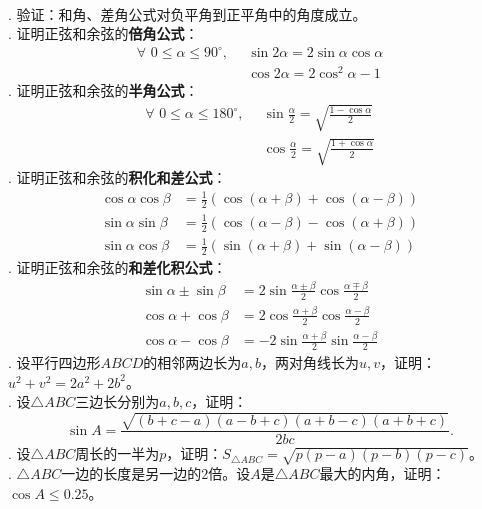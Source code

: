 \documentclass[12pt,UTF8,fontset=none]{ctexbook}
\begin{document}
\begin{xt}\label{xt:2-4-10}
    \mbox{} \\
    . 验证：和角、差角公式对负平角到正平角中的角度成立。 \\
    . 证明正弦和余弦的\textbf{倍角公式}：
    \begin{align*}
        \forall \,\, 0 \leqslant \alpha \leqslant 90^\circ , \,\,\, & \sin 2\alpha = 2\sin \alpha \cos \alpha  \\
        & \cos 2\alpha = 2\cos^2 \alpha - 1  
    \end{align*}
    . 证明正弦和余弦的\textbf{半角公式}：
    \begin{align*}
        \forall \,\, 0 \leqslant \alpha \leqslant 180^\circ , \,\,\, & \sin \frac{\alpha}{2} = \sqrt{\frac{1 - \cos \alpha}{2}}   \\
        & \cos \frac{\alpha}{2} = \sqrt{\frac{1 + \cos \alpha}{2}} 
    \end{align*}
    . 证明正弦和余弦的\textbf{积化和差公式}：
    \begin{align*}
        \cos \alpha \cos \beta &= \frac12 (\cos (\alpha + \beta) + \cos (\alpha - \beta))  \\
        \sin \alpha \sin \beta &= \frac12 (\cos (\alpha - \beta) - \cos (\alpha + \beta))  \\
        \sin \alpha \cos \beta &= \frac12 (\sin (\alpha + \beta) + \sin (\alpha - \beta))  
    \end{align*}
    . 证明正弦和余弦的\textbf{和差化积公式}：
    \begin{align*}
        \sin \alpha \pm \sin \beta &= 2\sin \frac{\alpha \pm \beta}{2} \cos \frac{\alpha \mp \beta}{2}  \\
        \cos \alpha + \cos \beta &= 2\cos \frac{\alpha + \beta}{2} \cos \frac{\alpha - \beta}{2}  \\
        \cos \alpha - \cos \beta &= -2\sin \frac{\alpha + \beta}{2} \sin \frac{\alpha - \beta}{2}  
    \end{align*}
    . 设平行四边形$ABCD$的相邻两边长为$a,b$，两对角线长为$u,v$，证明：$u^2 + v^2 = 2a^2 + 2b^2$。 \\
    . 设$\triangle ABC$三边长分别为$a,b,c$，证明：
    $$\sin A = \frac{\sqrt{(b+c-a)(a-b+c)(a+b-c)(a+b+c)}}{2bc}.$$ 
    . 设$\triangle ABC$周长的一半为$p$，证明：$S_{\triangle ABC} = \sqrt{p(p-a)(p-b)(p-c)}$。 \\
    . $\triangle ABC$一边的长度是另一边的$2$倍。设$A$是$\triangle ABC$最大的内角，证明：$\cos A \leqslant 0.25$。

\end{xt}
\end{document}
